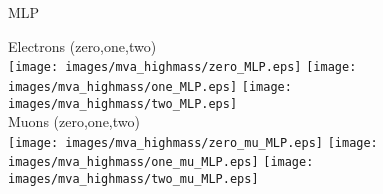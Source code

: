 \begin{frame}{MLP}
\begin{center}
Electrons (zero,one,two)\\
\texttt{[image: images/mva\_highmass/zero\_MLP.eps]}
\texttt{[image: images/mva\_highmass/one\_MLP.eps]}
\texttt{[image: images/mva\_highmass/two\_MLP.eps]}\\
Muons (zero,one,two)\\
\texttt{[image: images/mva\_highmass/zero\_mu\_MLP.eps]}
\texttt{[image: images/mva\_highmass/one\_mu\_MLP.eps]}
\texttt{[image: images/mva\_highmass/two\_mu\_MLP.eps]}\\
\end{center}
\end{frame}



